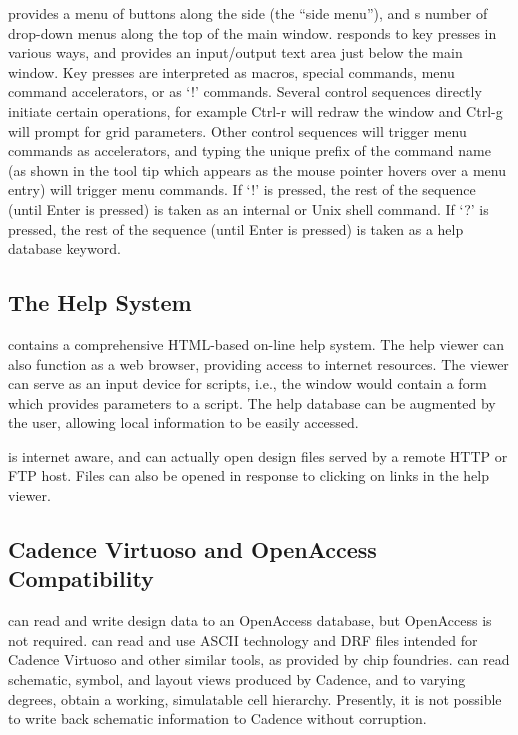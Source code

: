 {\Xic} provides a menu of buttons along the side (the ``side menu''),
and s number of drop-down menus along the top of the main window. 
{\Xic} responds to key presses in various ways, and provides an
input/output text area just below the main window.  Key presses are
interpreted as macros, special commands, menu command accelerators, or
as `!' commands.  Several control sequences directly initiate certain
operations, for example {\kb Ctrl-r} will redraw the window and {\kb
Ctrl-g} will prompt for grid parameters.  Other control sequences will
trigger menu commands as accelerators, and typing the unique prefix of
the command name (as shown in the tool tip which appears as the mouse
pointer hovers over a menu entry) will trigger menu commands.  If `!'
is pressed, the rest of the sequence (until {\kb Enter} is pressed) is
taken as an internal or Unix shell command.  If `?' is pressed, the
rest of the sequence (until {\kb Enter} is pressed) is taken as a help
database keyword.

\subsection{The Help System}

{\Xic} contains a comprehensive HTML-based on-line help system.  The
help viewer can also function as a web browser, providing access to
internet resources.  The viewer can serve as an input device for
scripts, i.e., the window would contain a form which provides
parameters to a script.  The help database can be augmented by the
user, allowing local information to be easily accessed.

{\Xic} is internet aware, and can actually open design files
served by a remote HTTP or FTP host.  Files can also be opened in
response to clicking on links in the help viewer.

\subsection{Cadence Virtuoso and OpenAccess Compatibility}

{\Xic} can read and write design data to an OpenAccess database, but
OpenAccess is not required.  {\Xic} can read and use ASCII technology
and DRF files intended for Cadence Virtuoso and other similar tools,
as provided by chip foundries.  {\Xic} can read schematic, symbol, and
layout views produced by Cadence, and to varying degrees, obtain a
working, simulatable cell hierarchy.  Presently, it is not possible
to write back schematic information to Cadence without corruption.

